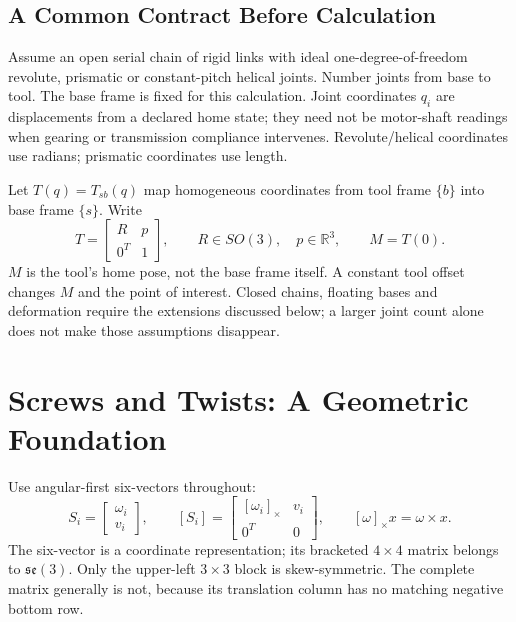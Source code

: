 \subsection{A Common Contract Before Calculation}

Assume an open serial chain of rigid links with ideal one-degree-of-freedom revolute, prismatic or constant-pitch helical joints. Number joints from base to tool. The base frame is fixed for this calculation. Joint coordinates $q_i$ are displacements from a declared home state; they need not be motor-shaft readings when gearing or transmission compliance intervenes. Revolute/helical coordinates use radians; prismatic coordinates use length.

Let $T(q)=T_{sb}(q)$ map homogeneous coordinates from tool frame $\{b\}$ into base frame $\{s\}$. Write
\begin{equation}
 T=\begin{bmatrix}R&p\\0^T&1\end{bmatrix},\qquad
 R\in SO(3),\quad p\in\mathbb R^3,\qquad M=T(0).
\end{equation}
$M$ is the tool's home pose, not the base frame itself. A constant tool offset changes $M$ and the point of interest. Closed chains, floating bases and deformation require the extensions discussed below; a larger joint count alone does not make those assumptions disappear.

\section{Screws and Twists: A Geometric Foundation}
\label{sec:screw_foundation}

Use angular-first six-vectors throughout:
\begin{equation}
 S_i=\begin{bmatrix}\omega_i\\v_i\end{bmatrix},\qquad
 [S_i]=\begin{bmatrix}[\omega_i]_\times&v_i\\0^T&0\end{bmatrix},
 \qquad [\omega]_\times x=\omega\times x.
\end{equation}
The six-vector is a coordinate representation; its bracketed $4\times4$ matrix belongs to $\mathfrak{se}(3)$. Only the upper-left $3\times3$ block is skew-symmetric. The complete matrix generally is not, because its translation column has no matching negative bottom row.

